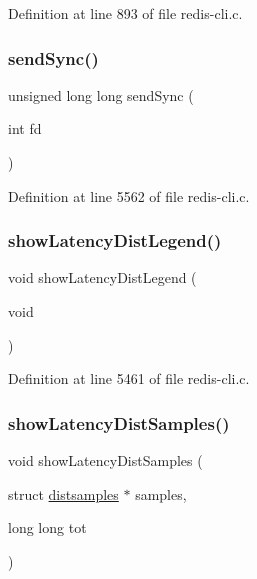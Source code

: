 Definition at line 893 of file redis-\/cli.\+c.

\mbox{\label{redis-cli_8c_a44d209c7dd563fe5a055b46d82c9cf49}} 
\subsubsection{\texorpdfstring{send\+Sync()}{sendSync()}}
{\footnotesize\ttfamily unsigned long long send\+Sync (\begin{DoxyParamCaption}\item[{int}]{fd }\end{DoxyParamCaption})}



Definition at line 5562 of file redis-\/cli.\+c.

\mbox{\label{redis-cli_8c_a0f17889840978a98905f650af146bb47}} 
\subsubsection{\texorpdfstring{show\+Latency\+Dist\+Legend()}{showLatencyDistLegend()}}
{\footnotesize\ttfamily void show\+Latency\+Dist\+Legend (\begin{DoxyParamCaption}\item[{void}]{ }\end{DoxyParamCaption})}



Definition at line 5461 of file redis-\/cli.\+c.

\mbox{\label{redis-cli_8c_aa482d47975ad5eaa1358dae2e61dc210}} 
\subsubsection{\texorpdfstring{show\+Latency\+Dist\+Samples()}{showLatencyDistSamples()}}
{\footnotesize\ttfamily void show\+Latency\+Dist\+Samples (\begin{DoxyParamCaption}\item[{struct \hyperlink{structdistsamples}{distsamples} $\ast$}]{samples,  }\item[{long long}]{tot }\end{DoxyParamCaption})}



